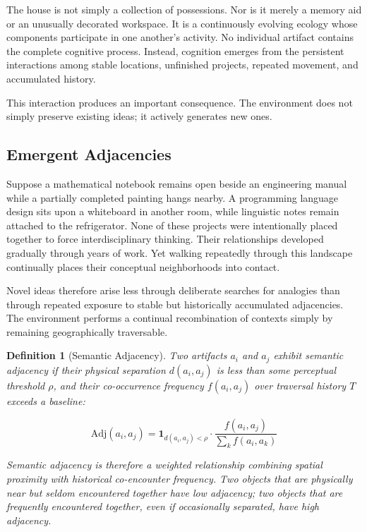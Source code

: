 \documentclass[12pt,oneside]{article}
\newtheorem{definition}{Definition}[section]
\theoremstyle{remark}
\begin{document}
The house is not simply a collection of possessions. Nor is it merely a memory aid or an unusually decorated workspace. It is a continuously evolving ecology whose components participate in one another's activity. No individual artifact contains the complete cognitive process. Instead, cognition emerges from the persistent interactions among stable locations, unfinished projects, repeated movement, and accumulated history.

This interaction produces an important consequence. The environment does not simply preserve existing ideas; it actively generates new ones.

\subsection{Emergent Adjacencies}

Suppose a mathematical notebook remains open beside an engineering manual while a partially completed painting hangs nearby. A programming language design sits upon a whiteboard in another room, while linguistic notes remain attached to the refrigerator. None of these projects were intentionally placed together to force interdisciplinary thinking. Their relationships developed gradually through years of work. Yet walking repeatedly through this landscape continually places their conceptual neighborhoods into contact.

Novel ideas therefore arise less through deliberate searches for analogies than through repeated exposure to stable but historically accumulated adjacencies. The environment performs a continual recombination of contexts simply by remaining geographically traversable.

\begin{definition}[Semantic Adjacency]
Two artifacts $a_i$ and $a_j$ exhibit semantic adjacency if their physical separation $d(a_i, a_j)$ is less than some perceptual threshold $\rho$, and their co-occurrence frequency $f(a_i, a_j)$ over traversal history $T$ exceeds a baseline:

\begin{equation}
\text{Adj}(a_i, a_j) = \mathbf{1}_{d(a_i, a_j) < \rho} \cdot \frac{f(a_i, a_j)}{\sum_{k} f(a_i, a_k)}
\end{equation}

Semantic adjacency is therefore a weighted relationship combining spatial proximity with historical co-encounter frequency. Two objects that are physically near but seldom encountered together have low adjacency; two objects that are frequently encountered together, even if occasionally separated, have high adjacency.
\end{definition}
\end{document}
